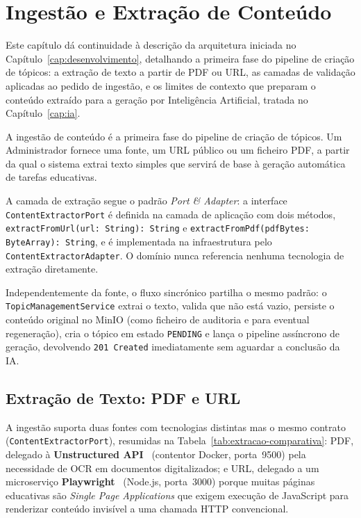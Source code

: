 %
%
\chapter{Ingestão e Extração de Conteúdo} \label{cap:ingestao}

Este capítulo dá continuidade à descrição da arquitetura iniciada no Capítulo~\ref{cap:desenvolvimento}, detalhando a primeira fase do pipeline de criação de tópicos: a extração de texto a partir de PDF ou URL, as camadas de validação aplicadas ao pedido de ingestão, e os limites de contexto que preparam o conteúdo extraído para a geração por Inteligência Artificial, tratada no Capítulo~\ref{cap:ia}.

A ingestão de conteúdo é a primeira fase do pipeline de criação de tópicos.
Um Administrador fornece uma fonte, um URL público ou um ficheiro PDF, a partir da qual o sistema extrai texto simples que servirá de base à geração automática de tarefas educativas.

A camada de extração segue o padrão \textit{Port \& Adapter}: a interface \texttt{ContentExtractorPort} é definida na camada de aplicação com dois métodos, \texttt{extractFromUrl(url: String): String} e \texttt{extractFromPdf(pdfBytes: ByteArray): String}, e é implementada na infraestrutura pelo \texttt{ContentExtractorAdapter}.
O domínio nunca referencia nenhuma tecnologia de extração diretamente.

Independentemente da fonte, o fluxo sincrónico partilha o mesmo padrão: o \texttt{Topic\allowbreak Management\allowbreak Service} extrai o texto, valida que não está vazio, persiste o conteúdo original no MinIO (como ficheiro de auditoria e para eventual regeneração), cria o tópico em estado \texttt{PENDING} e lança o pipeline assíncrono de geração, devolvendo \texttt{201 Created} imediatamente sem aguardar a conclusão da IA.

\section{Extração de Texto: PDF e URL} \label{sec:pdf} \label{sec:url}

A ingestão suporta duas fontes com tecnologias distintas mas o mesmo contrato (\texttt{ContentExtractorPort}), resumidas na Tabela~\ref{tab:extracao-comparativa}: PDF, delegado à \textbf{Unstructured API}~\cite{unstructured2023} (contentor Docker, porta~9500) pela necessidade de OCR em documentos digitalizados; e URL, delegado a um microserviço \textbf{Playwright}~\cite{playwright2023} (Node.js, porta~3000) porque muitas páginas educativas são \textit{Single Page Applications} que exigem execução de JavaScript para renderizar conteúdo invisível a uma chamada HTTP convencional.

